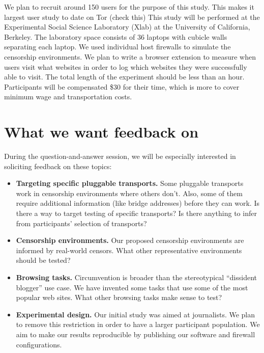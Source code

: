 \documentclass{sig-alternate-hotpets15}
\begin{document}

We plan to recruit around 150 users for the purpose of this study. This makes it largest user study to date on Tor (check this) This study will be performed at the Experimental Social Science Laboratory (Xlab) at the University of California, Berkeley. The laboratory space consists of 36 laptops with cubicle walls separating each laptop. We used individual host firewalls to simulate the censorship environments. We plan to write a browser extension to measure when users visit what websites in order to log which websites they were successfully able to visit. The total length of the experiment should be less than an hour. Participants will be compensated \$30 for their time, which is more to cover minimum wage and transportation costs.  \\

\section{What we want feedback on}

During the question-and-answer session,
we will be especially interested in soliciting feedback
on these topics:

\begin{itemize} \itemsep1pt \parskip0pt 
\item {\bfseries Targeting specific pluggable transports.}
Some pluggable transports work in censorship environments
where others don't.
Also, some of them require additional information
(like bridge addresses) before they can work.
Is there a way to target testing of specific transports?
Is there anything to infer from participants' selection of transports?

\item {\bfseries Censorship environments.}
Our proposed censorship environments are informed
by real-world censors.
What other representative environments
should be tested?

\item {\bfseries Browsing tasks.}
Circumvention is broader than the stereotypical
``dissident blogger'' use case.
We have invented some tasks that use some of the
most popular web sites.
What other browsing tasks make sense to test?

\item {\bfseries Experimental design.}
Our initial study was aimed at journalists.
We plan to remove this restriction in order
to have a larger participant population.
We aim to make our results reproducible by publishing
our software and firewall configurations.
\end{itemize}
\end{document}
